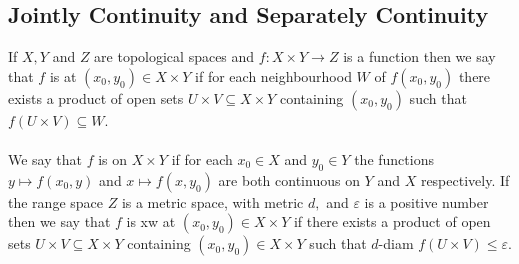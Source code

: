 \documentclass[11pt]{article}
\begin{document}
\subsection{Jointly Continuity and Separately Continuity}
If $X, Y$ and $Z$ are topological spaces and $f: X \times Y \rightarrow Z$ is a function then we say that $f$ is  at $\left(x_{0}, y_{0}\right) \in X \times Y$ if for each neighbourhood $W$ of $f\left(x_{0}, y_{0}\right)$ there exists a product of open sets $U \times V \subseteq X \times Y$ containing $\left(x_{0}, y_{0}\right)$ such that $f(U \times V) \subseteq W$. \\\\
We say that $f$ is  on $X \times Y$ if for each $x_{0} \in X$ and $y_{0} \in Y$ the functions $y \mapsto f\left(x_{0}, y\right)$ and $x \mapsto f\left(x, y_{0}\right)$ are both continuous on $Y$ and $X$ respectively. If the range space $Z$ is a metric space, with metric $d,$ and $\varepsilon$ is a positive number then we say that $f$ is xw at $\left(x_{0}, y_{0}\right) \in X \times Y$ if there exists a product of open sets $U \times V \subseteq X \times Y$ containing $\left(x_{0}, y_{0}\right) \in X \times Y$ such that $d$-diam $f(U \times V) \leq \varepsilon$.
\end{document}

